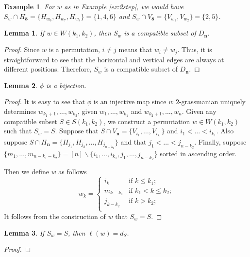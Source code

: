 \documentclass{amsart}
\newtheorem{lma}{Lemma}
\newtheorem{ex}{Example}
\newcommand{\bfn}{\mathbf{n}}
\begin{document}
\begin{ex}\label{ex:phiW}%
For $w$ as in Example \ref{ex:2step}, we would have $S_w \cap H_\mathbf{8}=\{ H_{w_{6}},H_{w_{7}}, H_{w_8} \}=\{ 1,4, 6 \}$ and $S_w \cap V_\mathbf{8} = \{V_{w_1},V_{w_2}\}= \{2,5\}$.   

\end{ex}





\begin{lma}
If $w\in W(k_1,k_2)$, then $S_w$ is a compatible subset of $D_\bfn$.
\end{lma}
\begin{proof}
Since $w$ is a permutation, $i\neq j$ means that $w_i\neq w_j$. Thus, it is straightforward to see that the horizontal and vertical edges are always at different positions. Therefore, $S_w$ is a compatible subset of $D_\bfn$.
\end{proof}

\begin{lma}
$\phi$ is a bijection.
\end{lma}
\begin{proof}
It is easy to see that $\phi$ is an injective map since $w$ $2$-grassmanian uniquely determines $w_{k_1+1},\ldots,w_{k_2}$, given $w_{1},\ldots,w_{k_1}$ and $w_{k_2+1},\ldots,w_{n}$. Given any compatible subset $S\in S(k_1,k_2)$, we construct a permutation $w\in W(k_1,k_2)$ such that $S_w=S$. Suppose that $S\cap V_\bfn = \{V_{i_1},\ldots,V_{i_{k_1}} \}$ and $i_1<\ldots<i_{k_1}$. Also suppose $S\cap H_\bfn=\{ H_{j_1},H_{j_2},\ldots, H_{j_{n-k_2}} \}$ and that $j_1<\ldots<j_{n-k_2}$. Finally, suppose $\{m_1, \ldots,m_{n-k_1-k_2}\} = [n]\backslash \{i_1,\ldots,i_{k_1},j_1,\ldots,j_{n-k_2} \}$ sorted in ascending order.

Then we define $w$ as follows
\[
w_k= 
\begin{cases}
  i_k & \text{if $k\leq k_1$};\\
  m_{k-k_1} & \text{if $k_1< k \leq k_2 $;}\\
  j_{k-k_2} & \text{if $k > k_2 $;}\\
\end{cases}
\]
It follows from the construction of $w$ that $S_{w}=S$.
\end{proof}

\begin{lma}
If $S_w=S$, then $\ell(w)=d_S$.
\end{lma}
\begin{proof}

\end{proof}
\end{document}
